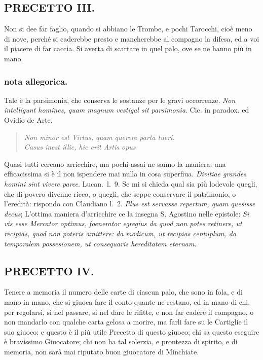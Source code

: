\documentclass[11pt,a6paper]{article}
\newcommand{\literaryquote}[1]{%
\kern -6pt  \begin{verse}
    {\footnotesize \it #1}
  \end{verse}\kern -2pt%
}
\begin{document}
\subsection{PRECETTO III.}

Non si dee far faglio, quando si abbiano
le Trombe, e pochi Tarocchi, cioè
meno di nove, perché si caderebbe presto e
mancherebbe al compagno la difesa, ed a voi
il piacere di far caccia. Si averta di scartare
in quel palo, ove se ne hanno più in mano.

\subsubsection{nota allegorica.}
{\footnotesize
Tale è la parsimonia, che conserva le sostanze
per le gravi occorrenze. \textit{Non intelligunt homines,
 quam magnum vestigal sit parsimonia}. Cic. in paradox.
ed Ovidio de Arte.

\literaryquote{Non minor est Virtus, quam querere parta tueri.\\
Casus inest illic, hic erit Artis opus}

Quasi tutti cercano arricchire, ma pochi assai ne
sanno la maniera: una efficacissima si è il non ispendere
mai nulla in cosa superfiua. \textit{Divitiae grandes
 homini sint vivere parce}. Lucan.\ l.\ 9. Se mi si chieda
qual sia più lodevole quegli, che di povero divenne
ricco, o quegli, che seppe conservare il patrimonio, o l'eredità: rispondo con Claudiano l.\ 2.
\textit{Plus est servasse repertum, quam quesisse decus};
L'ottima maniera d'arricchire ce la insegna S. Agostino
nelle epistole: \textit{Si vis esse Mercator optimus,
foenerator egregius da quod non potes retinere, ut
recipias, quod non poteris amittere: da modicum, ut
recipias centuplum, da temporalem possesionem, ut
consequaris hereditatem eternam}.
}

\subsection{PRECETTO IV.}

Tenere a memoria il numero delle carte
di ciascun palo, che sono in fola, e
di mano in mano, che si giuoca fare il conto
quante ne restano, ed in mano di chi, per
regolarsi, si nel passare, si nel dare le rifitte,
e non far cadere il compagno, o non mandarlo
con qualche carta gelosa a morire, ma
farli fare su le Cartiglie il suo giuoco: e questo
è il più utile Precetto di questo giuoco;
chi sa questo eseguire è bravissimo Giuocatore;
chi non ha tal solerzia, e prontezza di
spirito, e di memoria, non sarà mai riputato
buon giuocatore di Minchiate.
\end{document}
